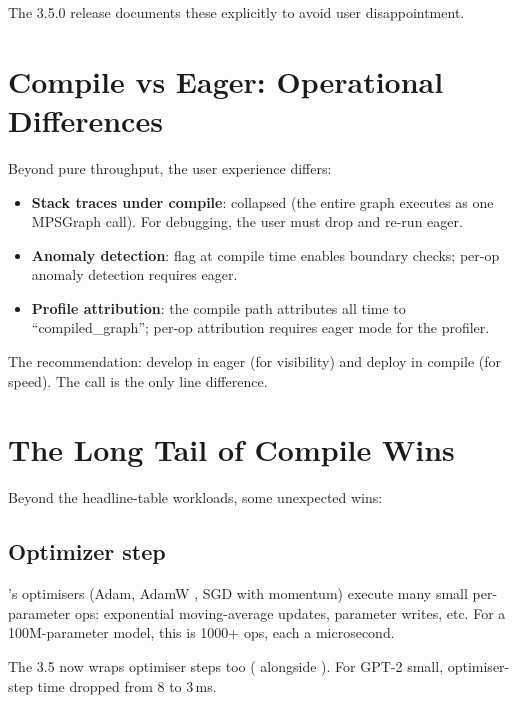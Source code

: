 The 3.5.0 release documents these explicitly to avoid user
disappointment.

\section{Compile vs Eager: Operational Differences}
\label{sec:graph_capture_wins:op_diff}

Beyond pure throughput, the user experience differs:

\begin{itemize}
  \item \textbf{Stack traces under compile}: collapsed (the
    entire graph executes as one MPSGraph call). For
    debugging, the user must drop  and re-run
    eager.
  \item \textbf{Anomaly detection}: 
    flag at compile time enables boundary checks; per-op
    anomaly detection requires eager.
  \item \textbf{Profile attribution}: the compile path attributes
    all time to ``compiled\_graph''; per-op attribution
    requires eager mode for the profiler.
\end{itemize}

The recommendation: develop in eager (for visibility) and
deploy in compile (for speed). The
 call is the only line difference.

\section{The Long Tail of Compile Wins}
\label{sec:graph_capture_wins:long_tail}

Beyond the headline-table workloads, some unexpected wins:

\subsection{Optimizer step}
\label{ssec:graph_capture_wins:optimizer_compile}

\Lucid's optimisers (Adam, AdamW \cite{loshchilov_adamw_2019},
SGD with momentum) execute many small per-parameter ops:
exponential moving-average updates, parameter writes, etc. For
a 100M-parameter model, this is 1000+ ops, each a microsecond.

The 3.5  now wraps optimiser steps too
( alongside ).
For GPT-2 small, optimiser-step time dropped from 8 to 3\,ms.

